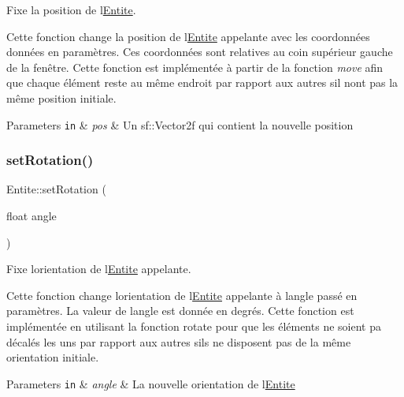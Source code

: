 Fixe la position de l\textquotesingle{}\mbox{\hyperlink{class_entite}{Entite}}. 

Cette fonction change la position de l\textquotesingle{}\mbox{\hyperlink{class_entite}{Entite}} appelante avec les coordonnées données en paramètres. Ces coordonnées sont relatives au coin supérieur gauche de la fenêtre. Cette fonction est implémentée à partir de la fonction {\itshape move} afin que chaque élément reste au même endroit par rapport aux autres s\textquotesingle{}il n\textquotesingle{}ont pas la même position initiale. 
\begin{DoxyParams}[1]{Parameters}
\mbox{\tt in}  & {\em pos} & Un {\ttfamily sf\+::\+Vector2f} qui contient la nouvelle position \\
\hline
\end{DoxyParams}
\mbox{\label{class_entite_a8623ac815e34b553098f45696ea8918b}} 
\subsubsection{\texorpdfstring{set\+Rotation()}{setRotation()}}
{\footnotesize\ttfamily Entite\+::set\+Rotation (\begin{DoxyParamCaption}\item[{float}]{angle }\end{DoxyParamCaption})}



Fixe l\textquotesingle{}orientation de l\textquotesingle{}\mbox{\hyperlink{class_entite}{Entite}} appelante. 

Cette fonction change l\textquotesingle{}orientation de l\textquotesingle{}\mbox{\hyperlink{class_entite}{Entite}} appelante à l\textquotesingle{}angle passé en paramètres. La valeur de l\textquotesingle{}angle est donnée en degrés. Cette fonction est implémentée en utilisant la fonction rotate pour que les éléments ne soient pa décalés les uns par rapport aux autres s\textquotesingle{}ils ne disposent pas de la même orientation initiale. 
\begin{DoxyParams}[1]{Parameters}
\mbox{\tt in}  & {\em angle} & La nouvelle orientation de l\textquotesingle{}\mbox{\hyperlink{class_entite}{Entite}} \\
\hline
\end{DoxyParams}
\mbox{\label{class_entite_a665939253829baba965ce3ead0f1739c}} 

